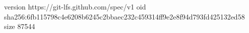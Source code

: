 version https://git-lfs.github.com/spec/v1
oid sha256:6fb115798c4e6208b6245c2bbaec232c459314ff9e2e8f94d793fd425132ed58
size 87544
